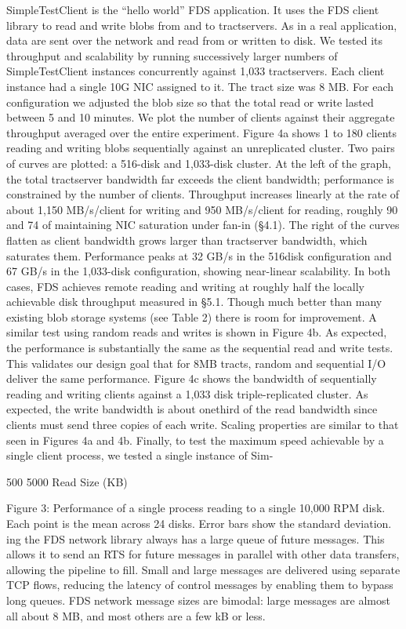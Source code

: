 SimpleTestClient is the “hello world” FDS application.
It uses the FDS client library to read and write blobs from
and to tractservers. As in a real application, data are sent
over the network and read from or written to disk. We
tested its throughput and scalability by running successively larger numbers of SimpleTestClient instances concurrently against 1,033 tractservers. Each client instance
had a single 10G NIC assigned to it. The tract size was
8 MB. For each configuration we adjusted the blob size
so that the total read or write lasted between 5 and 10
minutes. We plot the number of clients against their aggregate throughput averaged over the entire experiment.
Figure 4a shows 1 to 180 clients reading and writing
blobs sequentially against an unreplicated cluster. Two
pairs of curves are plotted: a 516-disk and 1,033-disk
cluster. At the left of the graph, the total tractserver bandwidth far exceeds the client bandwidth; performance is
constrained by the number of clients. Throughput increases linearly at the rate of about 1,150 MB/s/client for
writing and 950 MB/s/client for reading, roughly 90%
and 74%
of maintaining NIC saturation under fan-in (§4.1).
The right of the curves flatten as client bandwidth
grows larger than tractserver bandwidth, which saturates them. Performance peaks at 32 GB/s in the 516disk configuration and 67 GB/s in the 1,033-disk configuration, showing near-linear scalability. In both cases,
FDS achieves remote reading and writing at roughly half
the locally achievable disk throughput measured in §5.1.
Though much better than many existing blob storage systems (see Table 2) there is room for improvement.
A similar test using random reads and writes is shown
in Figure 4b. As expected, the performance is substantially the same as the sequential read and write tests. This
validates our design goal that for 8MB tracts, random and
sequential I/O deliver the same performance.
Figure 4c shows the bandwidth of sequentially reading
and writing clients against a 1,033 disk triple-replicated
cluster. As expected, the write bandwidth is about onethird of the read bandwidth since clients must send three
copies of each write. Scaling properties are similar to
that seen in Figures 4a and 4b.
Finally, to test the maximum speed achievable by a
single client process, we tested a single instance of Sim-

500
5000
Read Size (KB)

Figure 3: Performance of a single process reading to a
single 10,000 RPM disk. Each point is the mean across
24 disks. Error bars show the standard deviation.
ing the FDS network library always has a large queue of
future messages. This allows it to send an RTS for future
messages in parallel with other data transfers, allowing
the pipeline to fill.
Small and large messages are delivered using separate
TCP flows, reducing the latency of control messages by
enabling them to bypass long queues. FDS network message sizes are bimodal: large messages are almost all
about 8 MB, and most others are a few kB or less.

